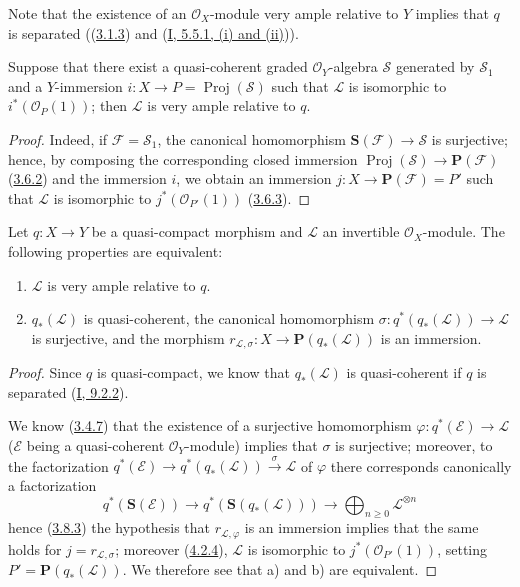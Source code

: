 Note that the existence of an $\mathcal{O}_X$-module very ample relative
to $Y$ implies that $q$ is separated
((\hyperref[II.3.1.3]{3.1.3}) and
(\hyperref[I.5.5.1]{I, 5.5.1, (i) and (ii)})).

\begin{corollary}[4.4.3]
\label{II.4.4.3}
Suppose that there exist a quasi-coherent graded $\mathcal{O}_Y$-algebra
$\mathcal{S}$ generated by $\mathcal{S}_1$ and a $Y$-immersion
$i:X\to P=\operatorname{Proj}(\mathcal{S})$ such that $\mathcal{L}$ is
isomorphic to $i^*(\mathcal{O}_P(1))$; then $\mathcal{L}$ is very ample
relative to $q$.
\end{corollary}

\begin{proof}
Indeed, if $\mathcal{F}=\mathcal{S}_1$, the canonical homomorphism
$\mathbf{S}(\mathcal{F})\to\mathcal{S}$ is surjective; hence, by composing
the corresponding closed immersion
$\operatorname{Proj}(\mathcal{S})\to\mathbf{P}(\mathcal{F})$
(\hyperref[II.3.6.2]{3.6.2}) and the immersion $i$, we obtain an immersion
$j:X\to\mathbf{P}(\mathcal{F})=P'$ such that $\mathcal{L}$ is isomorphic to
$j^*(\mathcal{O}_{P'}(1))$ (\hyperref[II.3.6.3]{3.6.3}).
\end{proof}

\begin{proposition}[4.4.4]
\label{II.4.4.4}
Let $q:X\to Y$ be a quasi-compact morphism and $\mathcal{L}$ an invertible
$\mathcal{O}_X$-module. The following properties are
equivalent:
\begin{enumerate}
  \item[\rm{a)}] $\mathcal{L}$ is very ample relative to $q$.
  \item[\rm{b)}] $q_*(\mathcal{L})$ is quasi-coherent, the canonical
  homomorphism $\sigma:q^*(q_*(\mathcal{L}))\to\mathcal{L}$ is surjective, and
  the morphism
  $r_{\mathcal{L},\sigma}:X\to\mathbf{P}(q_*(\mathcal{L}))$ is an immersion.
\end{enumerate}
\end{proposition}

\begin{proof}
Since $q$ is quasi-compact, we know that $q_*(\mathcal{L})$ is quasi-coherent
if $q$ is separated (\hyperref[I.9.2.2]{I, 9.2.2}).


We know (\hyperref[II.3.4.7]{3.4.7}) that the existence of a surjective
homomorphism $\varphi:q^*(\mathcal{E})\to\mathcal{L}$ ($\mathcal{E}$ being a
quasi-coherent $\mathcal{O}_Y$-module) implies that $\sigma$ is surjective;
moreover, to the factorization
$q^*(\mathcal{E})\to q^*(q_*(\mathcal{L}))\xrightarrow{\sigma}\mathcal{L}$
of $\varphi$ there corresponds canonically a factorization
\[
  q^*(\mathbf{S}(\mathcal{E}))
    \longrightarrow q^*(\mathbf{S}(q_*(\mathcal{L})))
    \longrightarrow\bigoplus_{n\geq0}\mathcal{L}^{\otimes n}
\]
hence (\hyperref[II.3.8.3]{3.8.3}) the hypothesis that
$r_{\mathcal{L},\varphi}$ is an immersion implies that the same holds for
$j=r_{\mathcal{L},\sigma}$; moreover
(\hyperref[II.4.2.4]{4.2.4}), $\mathcal{L}$ is isomorphic to
$j^*(\mathcal{O}_{P'}(1))$, setting
$P'=\mathbf{P}(q_*(\mathcal{L}))$. We therefore see that a) and b) are
equivalent.
\end{proof}

